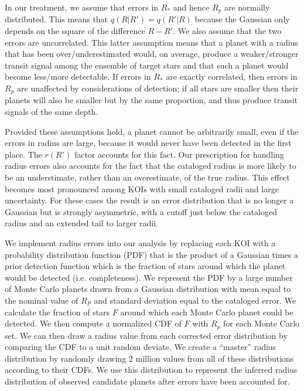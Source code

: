 In our treatment, we assume that errors in $R_*$ and hence $R_p$ are
normally distributed.  This means that
$q(R|R') = q(R'|R)$ because the Gaussian only depends on the square of
the difference $R-R'$.  We also assume that the two errors are 
uncorrelated.  This latter assumption means that a planet
with a radius that has been over/underestimated would, on average,
produce a weaker/stronger transit signal among the ensemble of target
stars and that such a planet would become less/more detectable.
If errors in $R_*$ are exactly correlated, then errors in $R_p$ are
unaffected by considerations of detection; if all stars are smaller
then their planets will also be smaller but by the same proportion,
and thus produce transit signals of the same depth.

Provided these assumptions hold, a planet cannot be arbitrarily small,
even if the errors in radius are large, because it would never have
been detected in the first place. The $r(R')$ factor accounts for this 
fact. Our prescription for handling radius errors also accounts for 
the fact that the cataloged radius is more 
likely to be an understimate, rather than an overestimate, of the 
true radius. This effect becomes most pronounced among KOIs with 
small cataloged radii and large uncertainty. For these cases the result is an error
distribution that is no longer a Gaussian but is strongly asymmetric,
with a cutoff just below the cataloged radius and an extended tail to
larger radii.

We implement radius errors into our analysis by replacing each KOI with a probability
distribution function (PDF) that is the product of a Gaussian times a
prior detection function which is the fraction of stars around which
the planet would be detected (i.e. completeness). We represent the 
PDF by a large number of Monte Carlo planets drawn from a Gaussian 
distribution with mean equal to the nominal value of $R_P$ and 
standard deviation equal to the cataloged error. We calculate the 
fraction of stars $F$ around which each
Monte Carlo planet could be detected.  We then compute a normalized
CDF of $F$ with $R_p$ for each Monte Carlo set.  We can then draw a
radius value from each corrected error distribution by comparing the
CDF to a unit random deviate.  We create a ``master'' radius
distribution by randomly drawing 2 million values from all of these
distributions according to their CDFs.  We use this distribution to
represent the inferred radius distribution of observed candidate
planets after errors have been accounted for.

